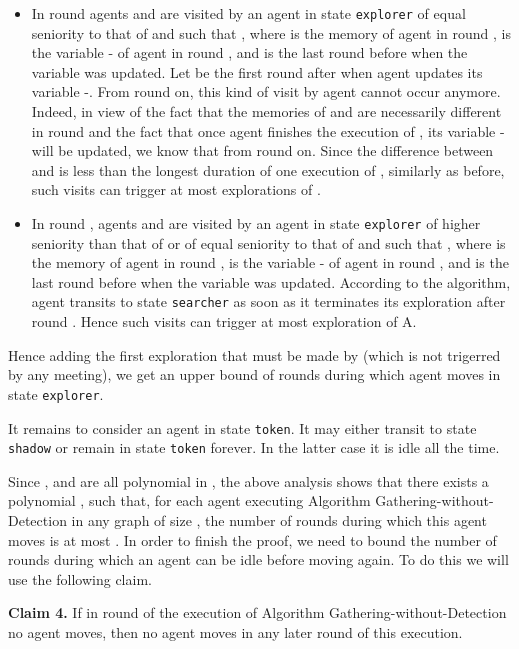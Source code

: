 \documentclass[11pt]{article}
\newcommand{\qed}{\hfill  \bigbreak}
\newenvironment{proof}{\noindent {\bf Proof.}}{\qed}
\begin{document}
\begin{proof}
\begin{itemize}
\item {In round  agents  and  are visited by an agent  in state {\tt explorer} of equal seniority to that of  and such that , where  is the memory of agent  in round ,  is the variable - of agent  in round , and  is the last round before  when the variable  was updated. Let  be the first round after  when agent  updates its variable -. From round  on, this kind of visit by agent  cannot occur anymore. Indeed, in view of the fact that the memories of  and  are necessarily different in round  and the fact that once agent  finishes the execution of , its variable - will be updated, we know that  from round  on. Since the difference between  and  is less than the longest duration of one execution of , similarly as before, such visits can trigger at most   explorations  of .}

\item  {In round , agents  and  are visited by an agent  in state {\tt explorer} of higher seniority than that of  or of equal seniority to that of  and such that , where  is the memory of agent  in round ,  is the variable - of agent  in round , and  is the last round before  when the variable  was updated. According to the algorithm, agent  transits to state {\tt searcher} as soon as it terminates its exploration  after round . Hence such visits can trigger at most  exploration  of A.}
\end{itemize}



{Hence adding the first exploration that must be made by  (which is not trigerred by any meeting), we get an upper bound of { rounds} during which agent  moves in state {\tt explorer}.}
      
      It remains to consider an agent in state {\tt token}. It may either transit to state {\tt shadow} or remain in state {\tt token} forever.
      In the latter case it is idle all the time. 
      
      Since {{},  and  are all polynomial in }, the above
      analysis shows that there exists a polynomial , such that, for each agent  executing Algorithm Gathering-without-Detection in any graph of size , the 
      number of rounds during which this agent moves is at most . In order to finish the proof, we need to bound the number of rounds during which an
      agent  can be idle before moving again. To do this we will use the following claim.
      
      \vspace*{0.3cm}
      \noindent
      {{\bf Claim 4.}} If in round  of the execution of Algorithm Gathering-without-Detection no agent moves, then no agent moves in any later round of this execution.
      

\end{proof}
\end{document}
